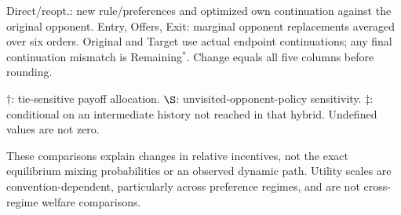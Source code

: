 \documentclass[10pt]{article}
\begin{document}
{Direct/reopt.: new rule/preferences and optimized own continuation against the original opponent. Entry, Offers, Exit: marginal opponent replacements averaged over six orders. Original and Target use actual endpoint continuations; any final continuation mismatch is Remaining$^*$. Change equals all five columns before rounding.\par
$\dagger$: tie-sensitive payoff allocation. $\S$: unvisited-opponent-policy sensitivity. $\ddagger$: conditional on an intermediate history not reached in that hybrid. Undefined values are not zero.\par
These comparisons explain changes in relative incentives, not the exact equilibrium mixing probabilities or an observed dynamic path. Utility scales are convention-dependent, particularly across preference regimes, and are not cross-regime welfare comparisons.}\par
\end{document}

